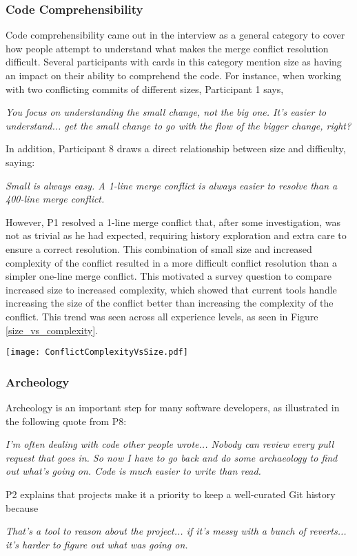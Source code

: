 \subsubsection{Code Comprehensibility}
Code comprehensibility came out in the interview as a general category to cover how people attempt to understand what makes the merge conflict resolution difficult. Several participants with cards in this category mention size as having an impact on their ability to comprehend the code. For instance, when working with two conflicting commits of different sizes, Participant 1 says,
\begin{displayquote}
\textit{You focus on understanding the small change, not the big one. It's easier to understand... get the small change to go with the flow of the bigger change, right?}
\end{displayquote}	
In addition, Participant 8 draws a direct relationship between size and difficulty, saying:
\begin{displayquote}
\textit{Small is always easy. A 1-line merge conflict is always easier to resolve than a 400-line merge conflict.}
\end{displayquote}
However, P1 resolved a 1-line merge conflict that, after some investigation, was not as trivial as he had expected, requiring history exploration and extra care to ensure a correct resolution. This combination of small size and increased complexity of the conflict resulted in a more difficult conflict resolution than a simpler one-line merge conflict.
This motivated a survey question to compare increased size to increased complexity, which showed that current tools handle increasing the size of the conflict better than increasing the complexity of the conflict. This trend was seen across all experience levels, as seen in Figure \ref{size_vs_complexity}.

\begin{figure*}[!t]
\centering
\texttt{[image: ConflictComplexityVsSize.pdf]}
\caption{Effectiveness of developer tools in supporting varying levels of size and complexity (by developer experience).}
\label{size_vs_complexity}
\end{figure*}

\subsubsection{Archeology}
Archeology is an important step for many software developers, as illustrated in the following quote from P8:
\begin{displayquote}
\textit{I'm often dealing with code other people wrote... Nobody can review every pull request that goes in. So now I have to go back and do some archaeology to find out what's going on. Code is much easier to write than read.}
\end{displayquote}
P2 explains that projects make it a priority to keep a well-curated Git history because
\begin{displayquote}
\textit{That's a tool to reason about the project... if it's messy with a bunch of reverts... it's harder to figure out what was going on.	}
\end{displayquote}

